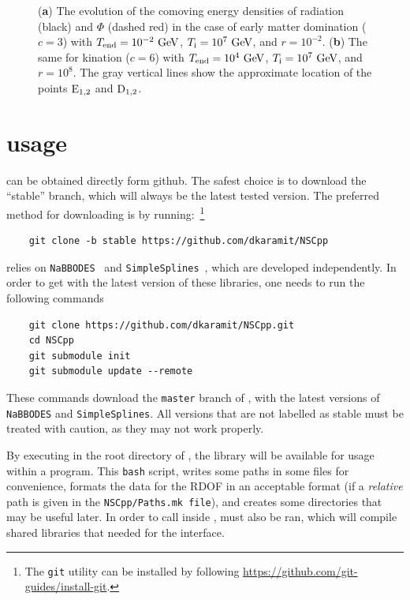 \documentclass[11pt,a4paper]{article}
\begin{document}
\begin{center}
\begin{figure}[t!]
\begin{subfigure}{0.5\textwidth}
			\caption{}
			\label{fig:EKD}
		\end{subfigure}
		\caption{
			({\bfseries a}) The evolution of the comoving energy densities of radiation (black) and $\Phi$ (dashed red) in the case of early matter domination ($c=3$) with $T_{\rm end}{}=10^{-2}~{\rm GeV}$, $T_{\rm i}{}=10^7~{\rm GeV}$, and $r=10^{-2}$. 
			({\bfseries b}) The same for kination ($c=6$) with $T_{\rm end}{}=10^{4}~{\rm GeV}$, $T_{\rm i}{}=10^7~{\rm GeV}$, and $r=10^{8}$.
			The gray vertical lines show the approximate location of the points ${\rm E_{1,2}}$ and ${\rm D_{1,2}}$.
		} 
		\label{fig:evolution_examples}
	\end{figure}
\end{center}




\section{\nsc usage}\label{sec:first_steps}
\setcounter{equation}{0}
%
\nsc can be obtained directly form github. The safest choice is to download the ``stable'' branch, which will always be the latest tested version. The preferred method for downloading \nsc is by running:~\footnote{The {\tt git} utility can be installed by following \href{https://github.com/git-guides/install-git}{https://github.com/git-guides/install-git}.}
%
\begin{lstlisting}
	git clone -b stable https://github.com/dkaramit/NSCpp
\end{lstlisting}

\nsc relies on {\tt NaBBODES}~\cite{NaBBODES} and {\tt SimpleSplines}~\cite{SimpleSplines}, which are developed independently. In order to get \nsc with the latest version of these libraries, one needs to run the following commands
%
\begin{lstlisting}
	git clone https://github.com/dkaramit/NSCpp.git
	cd NSCpp
	git submodule init
	git submodule update --remote
\end{lstlisting}
%
These commands download the {\tt master} branch of \nsc, with the latest versions of {\tt NaBBODES} and {\tt SimpleSplines}. All versions that are not labelled as stable must be treated with caution, as they may not work properly. 

By executing  in the root directory of \nsc, the library will be available for usage within a \CPP program. This {\tt bash} script, writes some paths in some files for convenience, formats the data for the RDOF in an acceptable format (if a {\em relative} path is given in the {\tt NSCpp/Paths.mk file}), and creates some directories that may be useful later. In order to call \nsc inside \PY,  must also be ran,  which will compile shared libraries that needed for the \PY interface.
\end{document}
